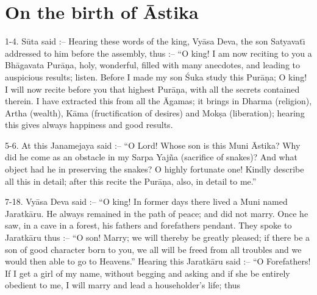 \chapter{On the birth of \=Astika}

1-4. S\=uta said :-- Hearing these words of the king, Vy\=asa Deva, the son Satyavat\={\i} addressed to him before the assembly, thus :-- ``O king! I am now reciting to you a Bh\=agavata Pur\=a\d{n}a, holy, wonderful, filled with many anecdotes, and leading to auspicious results; listen. Before I made my son \'Suka study this Pur\=a\d{n}a; O king! I will now recite before you that highest Pur\=a\d{n}a, with all the secrets contained therein. I have extracted this from all the \=Agamas; it brings in Dharma (religion), Artha (wealth), K\=ama (fructification of desires) and Mok\d{s}a (liberation); hearing this gives always happiness and good results.

5-6. At this Janamejaya said :-- ``O Lord! Whose son is this Muni \=Astika? Why did he come as an obstacle in my Sarpa Yaj\~na (sacrifice of snakes)? And what object had he in preserving the snakes? O highly fortunate one! Kindly describe all this in detail; after this recite the Pur\=a\d{n}a, also, in detail to me.''

7-18. Vy\=asa Deva said :-- ``O king! In former days there lived a Muni named Jaratk\=aru. He always remained in the path of peace; and did not marry. Once he saw, in a cave in a forest, his fathers and forefathers pendant. They spoke to Jaratk\=aru thus :-- ``O son! Marry; we will thereby be greatly pleased; if there be a son of good character born to you, we all will be freed from all troubles and we would then able to go to Heavens.'' Hearing this Jaratk\=aru said :-- ``O Forefathers! If I get a girl of my name, without begging and asking and if she be entirely obedient to me, I will marry and lead a householder's life; thus

